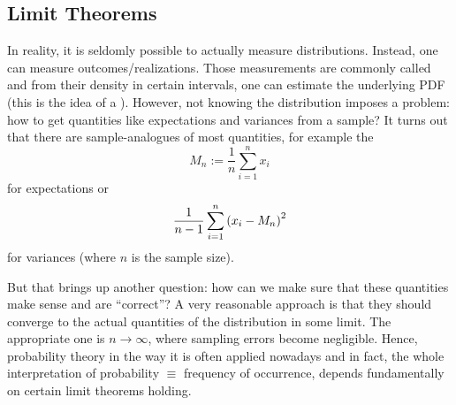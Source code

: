 	\subsection{Limit Theorems}\label{subsec:limit_thms}
In reality, it is seldomly possible to actually measure distributions. Instead, one can measure outcomes/realizations. Those measurements are commonly called  and from their density in certain intervals, one can estimate the underlying PDF (this is the idea of a ). However, not knowing the distribution imposes a problem: how to get quantities like expectations and variances from a sample? It turns out that there are sample-analogues of most quantities, for example the 
\begin{equation}\label{eq:sample_mean}
M_n := \frac{1}{n} \sum_{i = 1}^n x_i
\end{equation}
for expectations or
\begin{equation}
\frac{1}{n - 1} \sum_{i = 1}^n \qty(x_i - M_n)^2
\end{equation}
for variances (where $n$ is the sample size).


But that brings up another question: how can we make sure that these quantities make sense and are \enquote{correct}? A very reasonable approach is that they should converge to the actual quantities of the distribution in some limit. The appropriate one is $n \rightarrow \infty$, where sampling errors become negligible. Hence, probability theory in the way it is often applied nowadays and in fact, the whole interpretation of probability $\equiv$ frequency of occurrence, depends fundamentally on certain limit theorems holding.\\


